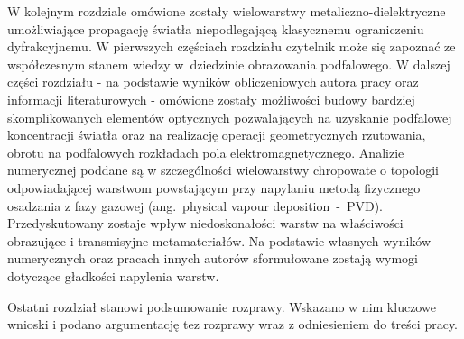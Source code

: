 W kolejnym rozdziale omówione zostały wielowarstwy metaliczno-dielektryczne umożliwiające propagację światła niepodlegającą klasycznemu ograniczeniu dyfrakcyjnemu. W pierwszych częściach rozdziału czytelnik może się zapoznać ze współczesnym stanem wiedzy w~dziedzinie obrazowania podfalowego. W dalszej części rozdziału - na podstawie wyników obliczeniowych autora pracy oraz informacji literaturowych - omówione zostały możliwości budowy bardziej skomplikowanych elementów optycznych pozwalających na uzyskanie podfalowej koncentracji światła oraz na realizację operacji geometrycznych rzutowania, obrotu na podfalowych rozkładach pola elektromagnetycznego. Analizie numerycznej poddane są w szczególności wielowarstwy chropowate o topologii odpowiadającej warstwom powstającym przy napylaniu metodą fizycznego osadzania z fazy gazowej (ang.~physical vapour deposition~-~PVD). Przedyskutowany zostaje wpływ niedoskonałości warstw na właściwości obrazujące i transmisyjne metamateriałów. Na podstawie własnych wyników numerycznych oraz pracach innych autorów sformułowane zostają wymogi dotyczące gładkości napylenia warstw.

Ostatni rozdział stanowi podsumowanie rozprawy. Wskazano w nim kluczowe wnioski i podano argumentację tez rozprawy wraz z odniesieniem do treści pracy.
